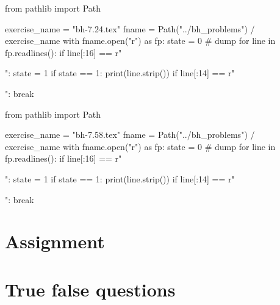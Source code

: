 \begin{pycode}
from pathlib import Path

exercise_name = "bh-7.24.tex"
fname = Path("../bh_problems") / exercise_name
with fname.open("r") as fp:
    state = 0  # dump
    for line in fp.readlines():
        if line[:16] == r"\begin{exercise}":
            state = 1
        if state == 1:
            print(line.strip())
        if line[:14] == r"\end{exercise}":
            break
\end{pycode}

\begin{pycode}
from pathlib import Path

exercise_name = "bh-7.58.tex"
fname = Path("../bh_problems") / exercise_name
with fname.open("r") as fp:
    state = 0  # dump
    for line in fp.readlines():
        if line[:16] == r"\begin{exercise}":
            state = 1
        if state == 1:
            print(line.strip())
        if line[:14] == r"\end{exercise}":
            break
\end{pycode}









\section{Assignment}
\label{sec:assignment}




\section{True false questions}
\label{sec:true-false-questions}






